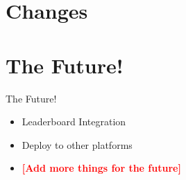 \documentclass[aspectratio=169]{beamer}
\newcommand{\todo}[1]{\textcolor{red}{\textbf{[#1]}}}
\begin{document}
\section{Changes}

\section{The Future!}

\begin{frame}{The Future!}
	\begin{itemize}
		
		\item Leaderboard Integration

		\item Deploy to other platforms

		\item \todo{Add more things for the future}

	\end{itemize}
\end{frame}

\end{document}
